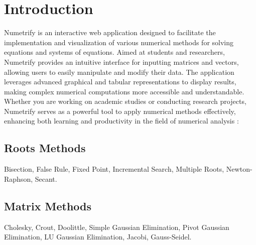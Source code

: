 \documentclass{uofa-eng-assignment}
\begin{document}
\maketitle


\section{Introduction}
Numetrify is an interactive web application designed to facilitate the implementation and visualization of various numerical methods for solving equations and systems of equations. Aimed at students and researchers, Numetrify provides an intuitive interface for inputting matrices and vectors, allowing users to easily manipulate and modify their data. The application leverages advanced graphical and tabular representations to display results, making complex numerical computations more accessible and understandable. Whether you are working on academic studies or conducting research projects, Numetrify serves as a powerful tool to apply numerical methods effectively, enhancing both learning and productivity in the field of numerical analysis :


\subsection{Roots Methods}

 Bisection,  False Rule,   Fixed Point,   Incremental Search,   Multiple Roots,   Newton-Raphson,   Secant.


\subsection{Matrix Methods }

Cholesky,   Crout,  Doolittle,  Simple Gaussian Elimination,  Pivot Gaussian Elimination,  LU Gaussian Elimination,   Jacobi,  Gauss-Seidel. 
\end{document}
